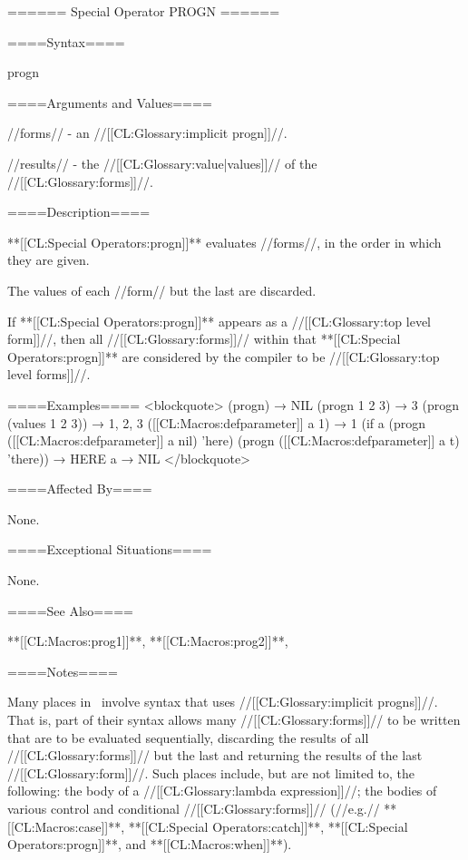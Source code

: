 ====== Special Operator PROGN ======

====Syntax====

\DefspecWithValues progn {} {}

====Arguments and Values====

//forms// - an //[[CL:Glossary:implicit progn]]//.

//results// - the //[[CL:Glossary:value|values]]// of the //[[CL:Glossary:forms]]//.

====Description====

**[[CL:Special Operators:progn]]** evaluates //forms//, in the order in which they are given.

The values of each //form// but the last are discarded.

If **[[CL:Special Operators:progn]]** appears as a //[[CL:Glossary:top level form]]//, then all //[[CL:Glossary:forms]]// within that **[[CL:Special Operators:progn]]** are considered by the compiler to be //[[CL:Glossary:top level forms]]//.

====Examples==== <blockquote> (progn) → NIL (progn 1 2 3) → 3 (progn (values 1 2 3)) → 1, 2, 3 ([[CL:Macros:defparameter]] a 1) → 1 (if a (progn ([[CL:Macros:defparameter]] a nil) 'here) (progn ([[CL:Macros:defparameter]] a t) 'there)) → HERE a → NIL </blockquote>

====Affected By====

None.

====Exceptional Situations====

None.

====See Also====

**[[CL:Macros:prog1]]**, **[[CL:Macros:prog2]]**, {\secref\Evaluation}

====Notes====

Many places in \clisp\ involve syntax that uses //[[CL:Glossary:implicit progns]]//. That is, part of their syntax allows many //[[CL:Glossary:forms]]// to be written that are to be evaluated sequentially, discarding the results of all //[[CL:Glossary:forms]]// but the last and returning the results of the last //[[CL:Glossary:form]]//. Such places include, but are not limited to, the following: the body of a //[[CL:Glossary:lambda expression]]//; the bodies of various control and conditional //[[CL:Glossary:forms]]// (//e.g.// **[[CL:Macros:case]]**, **[[CL:Special Operators:catch]]**, **[[CL:Special Operators:progn]]**, and **[[CL:Macros:when]]**).

